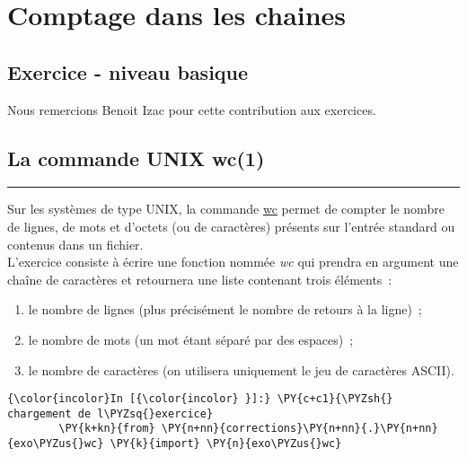     \hypertarget{comptage-dans-les-chaines}{%
\section{Comptage dans les chaines}\label{comptage-dans-les-chaines}}

    \hypertarget{exercice---niveau-basique}{%
\subsection{Exercice - niveau basique}\label{exercice---niveau-basique}}

    Nous remercions Benoit Izac pour cette contribution aux exercices.

    \hypertarget{la-commande-unix-wc1}{%
\subsection{La commande UNIX wc(1)}\label{la-commande-unix-wc1}}

\begin{center}\rule{0.5\linewidth}{\linethickness}\end{center}

Sur les systèmes de type UNIX, la commande
\href{http://pubs.opengroup.org/onlinepubs/9699919799/utilities/wc.html}{wc}
permet de compter le nombre de lignes, de mots et d'octets (ou de
caractères) présents sur l'entrée standard ou contenus dans un fichier.\\

L'exercice consiste à écrire une fonction nommée \emph{wc} qui prendra
en argument une chaîne de caractères et retournera une liste contenant
trois éléments~:

\begin{enumerate}
\def\labelenumi{\arabic{enumi}.}
\tightlist
\item
  le nombre de lignes (plus précisément le nombre de retours à la
  ligne)~;
\item
  le nombre de mots (un mot étant séparé par des espaces)~;
\item
  le nombre de caractères (on utilisera uniquement le jeu de caractères
  ASCII).
\end{enumerate}

    \begin{Verbatim}[commandchars=\\\{\}]
{\color{incolor}In [{\color{incolor} }]:} \PY{c+c1}{\PYZsh{} chargement de l\PYZsq{}exercice}
        \PY{k+kn}{from} \PY{n+nn}{corrections}\PY{n+nn}{.}\PY{n+nn}{exo\PYZus{}wc} \PY{k}{import} \PY{n}{exo\PYZus{}wc}
\end{Verbatim}


